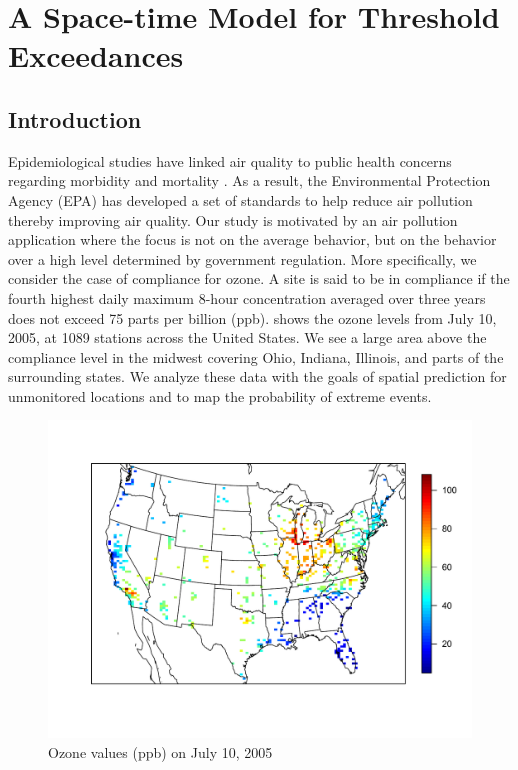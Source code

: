 \chapter{A Space-time \Skewt Model for Threshold Exceedances}
\label{stchap:two}
\section{Introduction}\label{sts:intro}
Epidemiological studies have linked air quality to public health concerns regarding morbidity and mortality \citep{Samet2000}.
As a result, the Environmental Protection Agency (EPA) has developed a set of standards to help reduce air pollution thereby improving air quality.
Our study is motivated by an air pollution application where the focus is not on the average behavior, but on the behavior over a high level determined by government regulation.
More specifically, we consider the case of compliance for ozone.
A site is said to be in compliance if the fourth highest daily maximum 8-hour concentration averaged over three years does not exceed 75 parts per billion (ppb).
 shows the ozone levels from July 10, 2005, at 1089 stations across the United States.
We see a large area above the compliance level in the midwest covering Ohio, Indiana, Illinois, and parts of the surrounding states.
We analyze these data with the goals of spatial prediction for unmonitored locations and to map the probability of extreme events.

\begin{figure}[h!tbp]
  \centering
  \includegraphics[width=0.75\linewidth]{plots/ozone-10jul-us.pdf}
  \caption{Ozone values (ppb) on July 10, 2005}
  \label{stfig:ozone-10jul}
\end{figure}

